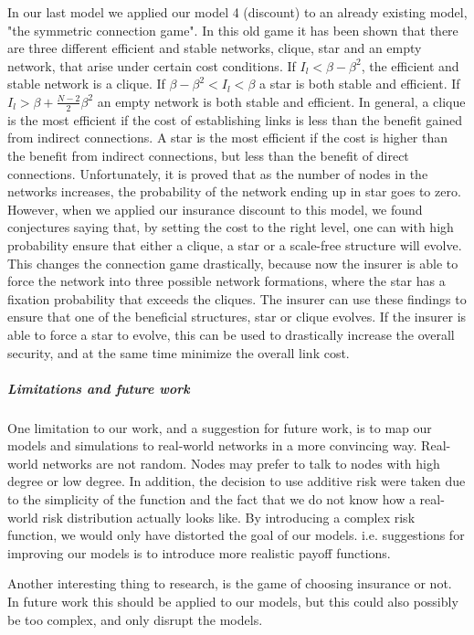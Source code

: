 In our last model we applied our model 4 (discount) to an already existing model, "the symmetric connection game". In this old game it has been shown that there are three different efficient and stable networks, clique, star and an empty network, that arise under certain cost conditions. If $I_{l}<\beta-\beta^{2}$, the efficient and stable network is a clique. If $\beta-\beta^{2}<I_{l}<\beta$ a star is both stable and efficient. If $I_{l}>\beta+\frac{N-2}{2}\beta^{2}$ an empty network is both stable and efficient. In general, a clique is the most efficient if the cost of establishing links is less than the benefit gained from indirect connections. A star is the most efficient if the cost is higher than the benefit from indirect connections, but less than the benefit of direct connections. 
Unfortunately, it is proved that as the number of nodes in the networks increases, the probability of the network ending up in star goes to zero. However, when we applied our insurance discount to this model, we found conjectures saying that, by setting the cost to the right level, one can with high probability ensure that either a clique, a star or a scale-free structure will evolve. This changes the connection game drastically, because now the insurer is able to force the network into three possible network formations, where the star has a fixation probability that exceeds the cliques. The insurer can use these findings to ensure that one of the beneficial structures, star or clique evolves. If the insurer is able to force a star to evolve, this can be used to drastically increase the overall security, and at the same time minimize the overall link cost. 

\subparagraph{Limitations and future work}
One limitation to our work, and a suggestion for future work, is to map our models and simulations to real-world networks in a more convincing way. Real-world networks are not random. Nodes may prefer to talk to nodes with high degree or low degree. In addition, the decision to use additive risk were taken due to the simplicity of the function and the fact that we do not know how a real-world risk distribution actually looks like.  By introducing a complex risk function, we would only have distorted the goal of our models. i.e. suggestions for improving our models is to introduce more realistic payoff functions.

Another interesting thing to research, is the game of choosing insurance or not. In future work this should be applied to our models, but this could also possibly be too complex, and only disrupt the models.


